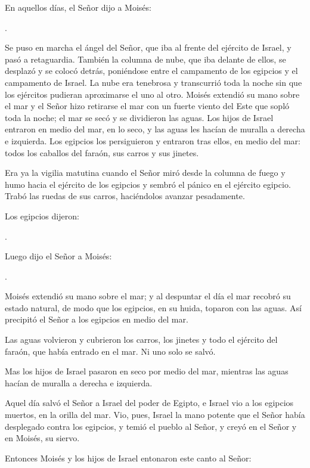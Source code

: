 \begin{scripture}
En aquellos días, el Señor dijo a Moisés: 

.

Se puso en marcha el ángel del Señor, que iba al frente del ejército de Israel, y pasó a retaguardia. También la columna de nube, que iba delante de ellos, se desplazó y se colocó detrás, poniéndose entre el campamento de los egipcios y el campamento de Israel. La nube era tenebrosa y transcurrió toda la noche sin que los ejércitos pudieran aproximarse el uno al otro. Moisés extendió su mano sobre el mar y el Señor hizo retirarse el mar con un fuerte viento del Este que sopló toda la noche; el mar se secó y se dividieron las aguas. Los hijos de Israel entraron en medio del mar, en lo seco, y las aguas les hacían de muralla a derecha e izquierda. Los egipcios los persiguieron y entraron tras ellos, en medio del mar: todos los caballos del faraón, sus carros y sus jinetes. 

Era ya la vigilia matutina cuando el Señor miró desde la columna de fuego y humo hacia el ejército de los egipcios y sembró el pánico en el ejército egipcio. Trabó las ruedas de sus carros, haciéndolos avanzar pesadamente. 

Los egipcios dijeron: 

.

Luego dijo el Señor a Moisés: 

.

Moisés extendió su mano sobre el mar; y al despuntar el día el mar recobró su estado natural, de modo que los egipcios, en su huida, toparon con las aguas. Así precipitó el Señor a los egipcios en medio del mar. 

Las aguas volvieron y cubrieron los carros, los jinetes y todo el ejército del faraón, que había entrado en el mar. Ni uno solo se salvó. 

Mas los hijos de Israel pasaron en seco por medio del mar, mientras las aguas hacían de muralla a derecha e izquierda. 

Aquel día salvó el Señor a Israel del poder de Egipto, e Israel vio a los egipcios muertos, en la orilla del mar. Vio, pues, Israel la mano potente que el Señor había desplegado contra los egipcios, y temió el pueblo al Señor, y creyó en el Señor y en Moisés, su siervo. 

Entonces Moisés y los hijos de Israel entonaron este canto al Señor:
\end{scripture}

